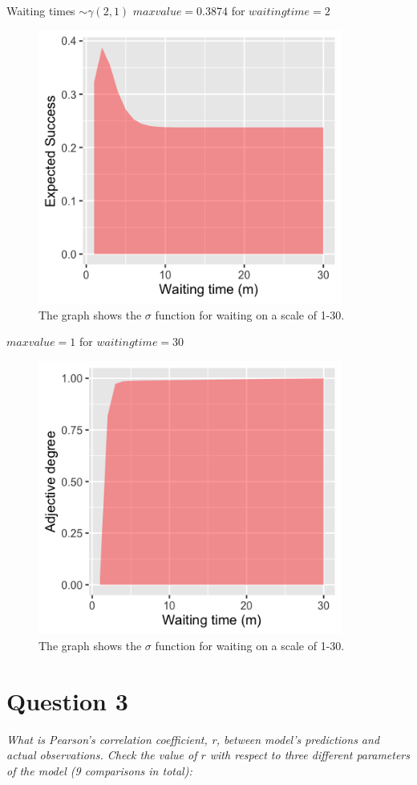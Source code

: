 \documentclass[11pt,a4paper,oneside]{article}
\begin{document}
Waiting times $\sim \mathcal{\gamma}(2, 1)$
$max value = 0.3874$ for $waiting time = 2$

\begin{figure}[H]
    \centering
    \includegraphics[width=100mm]{figs/Question_2_waiting_time_es.png}
    \caption{The graph shows the $\sigma$ function for waiting on a scale of 1-30.}
  \label{fig:q2_iq_sigma}
\end{figure}

$max value = 1$ for $waiting time = 30$
\begin{figure}[H]
    \centering
    \includegraphics[width=100mm]{figs/Question_2_waiting_time_sigma.png}
    \caption{The graph shows the $\sigma$ function for waiting on a scale of 1-30.}
  \label{fig:q2_iq_sigma}
\end{figure}

\section{Question 3}
\label{Q3}
\textit{What is Pearson’s correlation coefficient, r, between model’s predictions and actual observations. Check the value of $r$ with respect to three different parameters of the model (9 comparisons in total):}
\end{document}
